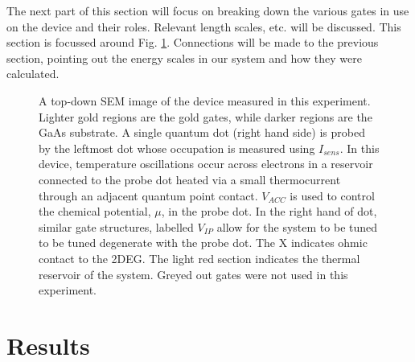 The next part of this section will focus on breaking down the various gates in use on the device and their roles. Relevant length scales, etc. will be discussed. This section is focussed around Fig. \ref{fig:device}. Connections will be made to the previous section, pointing out the energy scales in our system and how they were calculated.

\begin{figure}[h]
\centering
{}
\caption{ A top-down SEM image of the device measured in this experiment. Lighter gold regions are the gold gates, while darker regions are the GaAs substrate. A single quantum dot (right hand side) is probed by the leftmost dot whose occupation is measured using $I_{sens}$. In this device, temperature oscillations occur across electrons in a reservoir connected to the probe dot heated via a small thermocurrent through an adjacent quantum point contact. $V_{ACC}$ is used to control the chemical potential, $\mu$, in the probe dot. In the right hand of dot, similar gate structures, labelled $V_{IP}$ allow for the system to be tuned to be tuned degenerate with the probe dot. The X indicates ohmic contact to the 2DEG. The light red section indicates the thermal reservoir of the system. Greyed out gates were not used in this experiment.}
\label{fig:device}       %
\end{figure}

\section{Results}
\label{sec:results}

